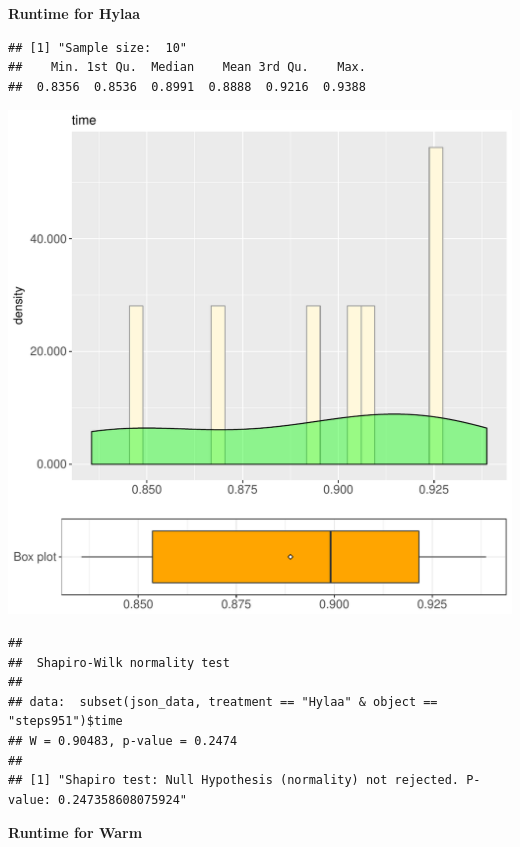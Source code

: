 \documentclass{article}\usepackage[]{graphicx}\usepackage[]{color}
\makeatletter
\def\maxwidth{ %
  \ifdim\Gin@nat@width>\linewidth
    \linewidth
  \else
    \Gin@nat@width
  \fi
}
\newenvironment{kframe}{%
 \def\at@end@of@kframe{}%
 \ifinner\ifhmode%
  \def\at@end@of@kframe{\end{minipage}}%
  \begin{minipage}{\columnwidth}%
 \fi\fi%
 \def\FrameCommand##1{\hskip\@totalleftmargin \hskip-\fboxsep
 \colorbox{shadecolor}{##1}\hskip-\fboxsep
     \hskip-\linewidth \hskip-\@totalleftmargin \hskip\columnwidth}%
 \MakeFramed {\advance\hsize-\width
   \@totalleftmargin\z@ \linewidth\hsize
   \@setminipage}}%
 {\par\unskip\endMakeFramed%
 \at@end@of@kframe}
\newenvironment{knitrout}{}{} %
\makeatother
\begin{document}
 \textbf{Runtime for Hylaa}
\begin{knitrout}
\color{fgcolor}\begin{kframe}
\begin{verbatim}
## [1] "Sample size:  10"
##    Min. 1st Qu.  Median    Mean 3rd Qu.    Max. 
##  0.8356  0.8536  0.8991  0.8888  0.9216  0.9388
\end{verbatim}
\end{kframe}
\includegraphics[width=\maxwidth]{figure/RH1_Hylaa_steps951-1} 
\begin{kframe}\begin{verbatim}
## 
## 	Shapiro-Wilk normality test
## 
## data:  subset(json_data, treatment == "Hylaa" & object == "steps951")$time
## W = 0.90483, p-value = 0.2474
## 
## [1] "Shapiro test: Null Hypothesis (normality) not rejected. P-value: 0.247358608075924"
\end{verbatim}
\end{kframe}
\end{knitrout}
 \textbf{Runtime for Warm}
\end{document}
